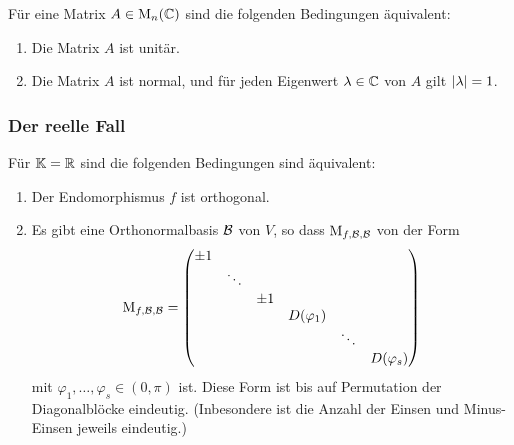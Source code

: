 \begin{corollary}
  Für eine Matrix $A \in \operatorname{M}_{n}(\mathbb{C})$ sind die folgenden Bedingungen äquivalent:
  \begin{enumerate}
    \item
      Die Matrix $A$ ist unitär.
    \item
      Die Matrix $A$ ist normal, und für jeden Eigenwert $\lambda \in \mathbb{C}$ von $A$ gilt $\left| \lambda \right| = 1$.
  \end{enumerate}
\end{corollary}



\subsubsection{Der reelle Fall}

\begin{theorem}
  Für $\mathbb{K} = \mathbb{R}$ sind die folgenden Bedingungen sind äquivalent:
  \begin{enumerate}
    \item
      Der Endomorphismus $f$ ist orthogonal.
    \item
      Es gibt eine Orthonormalbasis $\mathcal{B}$ von $V$, so dass $\operatorname{M}_{f, \mathcal{B}, \mathcal{B}}$ von der Form
      \begin{equation}
      \label{equation: normal form for orthogonal endomorphisms}
          \operatorname{M}_{f, \mathcal{B}, \mathcal{B}}
        = \begin{pmatrix}
            \pm 1 &         &       &               &         &               \\
                  & \ddots  &       &               &         &               \\
                  &         & \pm 1 &               &         &               \\
                  &         &       & D(\varphi_1)  &         &               \\
                  &         &       &               & \ddots  &               \\
                  &         &       &               &         & D(\varphi_s)
          \end{pmatrix}
      \end{equation}
      mit $\varphi_1, \dotsc, \varphi_s \in (0, \pi)$ ist.
      Diese Form ist bis auf Permutation der Diagonalblöcke eindeutig.
      (Inbesondere ist die Anzahl der Einsen und Minus-Einsen jeweils eindeutig.)
  \end{enumerate}
\end{theorem}

